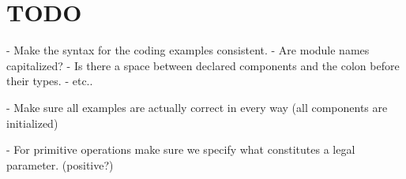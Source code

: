 \documentclass[12pt]{article}
\begin{document}
%
\section{TODO}

- Make the syntax for the coding examples consistent.
   - Are module names capitalized?
   - Is there a space between declared components and the colon before their types.
   - etc..

- Make sure all examples are actually correct in every way (all components are initialized)   

- For primitive operations make sure we specify what constitutes a legal parameter. (positive?)
\end{document}
